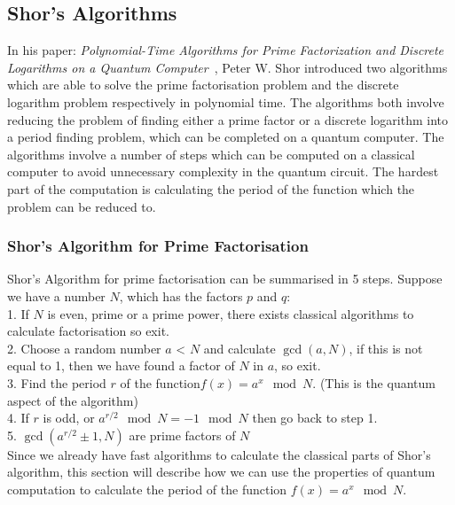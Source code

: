 \subsection{Shor's Algorithms}
In his paper: \emph{Polynomial-Time Algorithms for Prime Factorization and Discrete Logarithms on a Quantum Computer}~\cite{shor1999polynomial}, Peter W. Shor introduced two algorithms which are able to solve the prime factorisation problem and the discrete logarithm problem respectively in polynomial time. The algorithms both involve reducing the problem of finding either a prime factor or a discrete logarithm into a period finding problem, which can be completed on a quantum computer. The algorithms involve a number of steps which can be computed on a classical computer to avoid unnecessary complexity in the quantum circuit. The hardest part of the computation is calculating the period of the function which the problem can be reduced to.
\subsubsection{Shor's Algorithm for Prime Factorisation}
Shor's Algorithm for prime factorisation can be summarised in 5 steps. Suppose we have a number $N$, which has the factors $p$ and $q$: \\
1. If $N$ is even, prime or a prime power, there exists classical algorithms to calculate factorisation so exit.\\
2. Choose a random number $a$ < $N$ and calculate $\gcd(a,N)$, if this is not equal to 1, then we have found a factor of $N$ in $a$, so exit.\\
3. Find the period $r$ of the function$f(x) = a^x\mod N$. (This is the quantum aspect of the algorithm)\\
4. If $r$ is odd, or $a^{r/2}\mod N = -1\mod N$ then go back to step 1.\\
5. $\gcd(a^{r/2}\pm 1, N)$ are prime factors of $N$\\
Since we already have fast algorithms to calculate the classical parts of Shor's algorithm, this section will describe how we can use the properties of quantum computation to calculate the period of the function $f(x) = a^x\mod N$.
